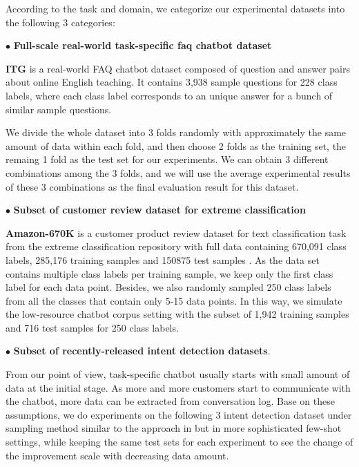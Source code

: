 \documentclass[letterpaper]{article} %
\begin{document}
  According to the task and domain, we categorize our experimental datasets into
  the following 3 categories:

  $\bullet$ \textbf{Full-scale real-world task-specific faq chatbot dataset}

  \textbf{ITG}  is  a  real-world  FAQ  chatbot dataset composed of question and
  answer pairs about online English teaching. It contains 3,938 sample questions
  for  228  class labels, where each class label corresponds to an unique answer
  for a bunch of similar sample questions.

  We  divide the whole dataset into 3 folds randomly with approximately the same
  amount  of data within each fold, and then choose 2 folds as the training set,
  the  remaing  1  fold  as  the  test  set for our experiments. We can obtain 3
  different  combinations  among  the  3  folds,  and  we  will  use the average
  experimental  results  of  these 3 combinations as the final evaluation result
  for this dataset.

  $\bullet$ \textbf{Subset of customer review dataset for extreme classification}

  \textbf{Amazon-670K}   is   a   customer   product  review  dataset  for  text
  classification  task from the extreme classification repository with full data
  containing  670,091  class  labels,  285,176  training samples and 150875 test
  samples \cite{bhatia2016extreme}.  As  the  data  set  contains  multiple class
  labels  per  training sample, we keep only the first class label for each data
  point. Besides, we also randomly sampled 250 class labels from all the classes
  that  contain only 5-15 data points. In this way, we simulate the low-resource
  chatbot  corpus setting with the subset of 1,942 training samples and 716 test
  samples for 250 class labels.

  $\bullet$ \textbf{Subset of recently-released intent detection datasets}.

  From our point of view, task-specific chatbot usually starts with small amount
  of  data at the initial stage. As more and more customers start to communicate
  with  the  chatbot,  more data can be extracted from conversation log. Base on
  these  assumptions,  we  do  experiments  on  the following 3 intent detection
  dataset    under    sampling    method    similar    to    the   approach   in
   \cite{casanueva2020efficient}  but  in  more  sophisticated few-shot settings,
  while  keeping the same test sets for each experiment to see the change of the
  improvement scale with decreasing data amount.
\end{document}
